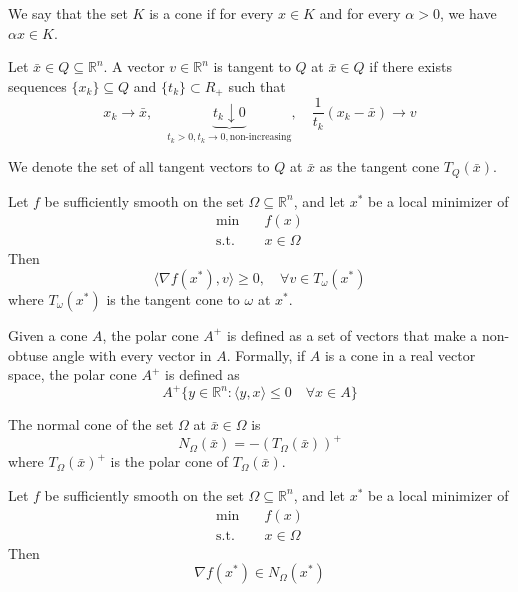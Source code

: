 \begin{definition}[Cone]
    We say that the set $K$ is a cone if for every $x \in K$ and for every $\alpha > 0$, we have $\alpha x \in K$.
\end{definition}
\begin{definition}
    Let $\bar x \in Q \subseteq \mathbb R^n$. A vector $v \in \mathbb R^n$ is tangent to $Q$ at $\bar x \in Q$ if there exists sequences $\{x_k\}\subseteq Q$ and $\{t_k\} \subset R_+$ such that $$x_k \to \bar x, \quad \underbrace{t_k \downarrow 0}_{t_k > 0, t_k \to 0, \text{non-increasing}}, \quad \frac{1}{t_k}(x_k - \bar x) \to v$$
\end{definition}
\begin{definition}
    We denote the set of all tangent vectors to $Q$ at $\bar x$ as the tangent cone $T_Q(\bar x)$.
\end{definition}
\begin{theorem}
    Let $f$ be sufficiently smooth on the set $\Omega \subseteq \mathbb R^n$, and let $x^*$ be a local minimizer of 
    \begin{align*}
        \min \quad & f(x) \\
        \text{s.t.} \quad & x \in \Omega
    \end{align*}
    Then $$\langle \nabla f(x^*), v \rangle \geq 0, \quad \forall v \in T_\omega(x^*)$$
    where $T_\omega(x^*)$ is the tangent cone to $\omega$ at $x^*$.
\end{theorem}
\begin{definition}
    Given a cone $A$, the polar cone $A^+$ is defined as a set of vectors that make a non-obtuse angle with every vector in $A$. Formally, if $A$ is a cone in a real vector space, the polar cone $A^+$ is defined as
    $$A^+ \{y \in \mathbb R^n: \langle y, x \rangle \leq 0 \quad \forall x \in A\}$$
\end{definition}
\begin{definition}
    The normal cone of the set $\Omega$ at $\bar x \in \Omega$ is $$N_{\Omega}(\bar x) = -(T_\Omega(\bar x))^+$$ 
    where $T_\Omega(\bar x)^+$ is the polar cone of $T_\Omega(\bar x)$.
\end{definition}
\begin{corollary}
    Let $f$ be sufficiently smooth on the set $\Omega \subseteq \mathbb R^n$, and let $x^*$ be a local minimizer of 
    \begin{align*}
        \min \quad & f(x) \\
        \text{s.t.} \quad & x \in \Omega
    \end{align*}
    Then $$\nabla f(x^*) \in N_\Omega(x^*)$$
\end{corollary}
